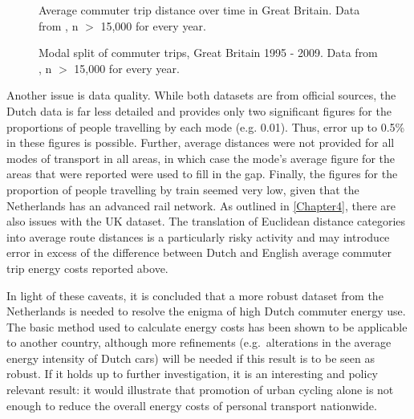 \begin{figure}
 \caption[Average commuter trip distance over time in Great Britain]
 {Average commuter trip distance over time in Great Britain. Data from
 \citet[table 9]{DfT2011-commuting}, n $>$ 15,000 for every year.} \label{fcommuterdistime}
\end{figure}

\begin{figure}
 \caption[Modal split of commuter trips, Great Britain 1995 - 2009]
 {Modal split of commuter trips, Great Britain 1995 - 2009. Data from
 \citet[table 9]{DfT2011-commuting}, n $>$ 15,000 for every year.} \label{fmode-time-dft2011}
\end{figure}

Another issue is data quality. While both datasets
are from official sources, the Dutch data is far less detailed and provides
only two significant figures for the proportions of people travelling by each
mode (e.g. 0.01). Thus, error up to 0.5\% in these figures is possible.
Further, average distances were not provided for all modes of transport in all
areas, in which case the mode's average figure for the areas that were reported
were used to fill in the gap. Finally, the figures for the proportion of people
travelling by train seemed very low, given that the Netherlands has an
advanced rail network. As outlined in \cref{Chapter4}, %
there are also issues with the UK dataset. The translation of
Euclidean distance
categories into average route distances is a particularly risky
activity and may introduce error in excess of the difference between
Dutch and English average commuter trip energy costs reported above.

In light of these caveats, it is concluded that a 
more robust dataset from the Netherlands is needed to resolve the
enigma of high Dutch commuter energy use. The basic method used to calculate
energy costs has been shown to be applicable to another country,
although more refinements (e.g.~alterations in the average energy
intensity of Dutch cars) will be needed if this result is to be
seen as robust. If it holds up to further investigation, it is an interesting
and policy relevant result: it would illustrate that promotion of urban
cycling alone is not enough to reduce the overall energy costs of personal
transport nationwide.


